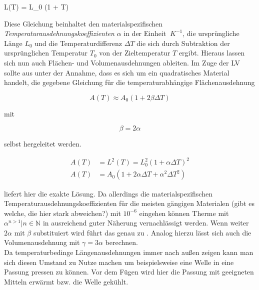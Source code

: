 \be
    L(T) = L_0 (1 + \alpha \Delta T) \label{length}\\
\ee

Diese Gleichung beinhaltet den materialspezifischen \textit{Temperaturausdehnungskoeffizienten} \(\alpha\) in der Einheit \(\SI{}{K}^{-1}\), die ursprüngliche Länge \(L_0\)
und die Temperaturdifferenz \(\Delta T\) die sich durch Subtraktion der ursprünglichen Temperatur \(T_0\) von der Zieltemperatur \(T\) ergibt.
Hieraus lassen sich nun auch Flächen- und Volumenausdehnungen ableiten. Im Zuge der LV sollte aus  unter der Annahme, dass es sich um ein quadratisches Material handelt,
die gegebene Gleichung für die temperaturabhängige Flächenausdehnung 

\begin{equation}
A(T) \approx  A_0 (1 + 2 \beta \Delta T) \label{area}
\end{equation}

mit

\begin{equation*}
    \beta = 2 \alpha
\end{equation*}

selbst hergeleitet werden.

\begin{align}
    A(T) &= L^{2}(T) = L_{0}^{2} (1 + \alpha \Delta T)^{2} \nonumber\\
    A(T) &= A_0 (1 + 2 \alpha \Delta T + \alpha^{2} \Delta T^{2}) \label{area_exakt}
\end{align}

 liefert hier die exakte Lösung. Da allerdings die materialspezifischen Temperaturausdehnungskoeffizienten für die meisten gängigen Materialen (gibt es welche, die hier stark abweichen?)
mit \(10^{-6}\) eingehen können Therme mit \(\alpha^{n>1} | n \in \mathbb{N} \) in ausreichend guter Näherung vernachlässigt werden. Wenn weiter \(2 \alpha\) mit \(\beta\) substituiert wird führt das genau zu
. Analog hierzu lässt sich auch die Volumenausdehnung mit \(\gamma = 3\alpha\) berechnen.\\
Da temperaturbedinge Längenausdehnungen immer nach außen zeigen kann man sich diesen Umstand zu Nutze machen um beispielsweise eine Welle in eine Passung pressen zu können. Vor dem Fügen
wird hier die Passung mit geeigneten Mitteln erwärmt bzw. die Welle gekühlt.